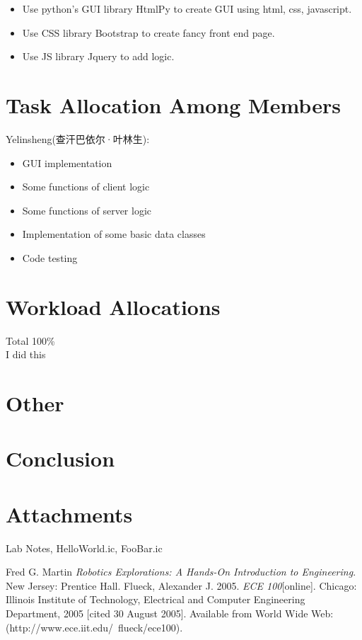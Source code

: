 \documentclass[a4paper, 11pt]{article}
\begin{document}
\begin{itemize}
  \item Use python's GUI library HtmlPy to create GUI using html, css, javascript.
  \item Use CSS library Bootstrap to create fancy front end page. 
  \item Use JS library Jquery to add logic.
\end{itemize}


\section*{Task Allocation Among Members}

Yelinsheng(查汗巴依尔·叶林生):

\begin{itemize}
  \item GUI implementation
  \item Some functions of client logic
  \item Some functions of server logic
  \item Implementation of some basic data classes
  \item Code testing
\end{itemize}

\section*{Workload Allocations}
Total 100\% \\
I did this

\section*{Other}
\lipsum[7]

\section*{Conclusion}
\lipsum[6]


\section*{Attachments}
Lab Notes, HelloWorld.ic, FooBar.ic

\begin{thebibliography}{9}
 Fred G. Martin \emph{Robotics Explorations: A Hands-On Introduction to Engineering}. New Jersey: Prentice Hall.
  Flueck, Alexander J. 2005. \emph{ECE 100}[online]. Chicago: Illinois Institute of Technology, Electrical and Computer Engineering Department, 2005 [cited 30 August 2005]. Available from World Wide Web: (http://www.ece.iit.edu/~flueck/ece100).
\end{thebibliography}
\end{document}
